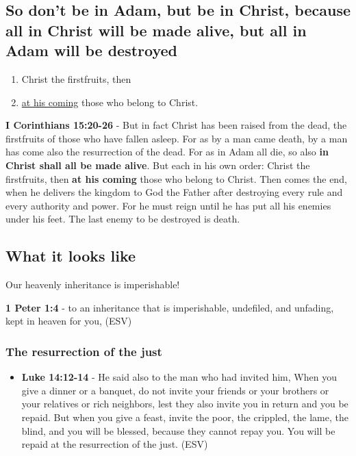 \documentclass[11pt]{article}
\begin{document}
\subsection{So don't be in Adam, but be in Christ, because all in Christ will be made alive, but all in Adam will be destroyed}
\label{sec:org59de661}
\begin{enumerate}
\item Christ the firstfruits, then
\item \uline{at his coming} those who belong to Christ.
\end{enumerate}

\textbf{I Corinthians 15:20-26} - But in fact Christ has been raised from the dead, the firstfruits of those who have fallen asleep.  For as by a man came death, by a man has come also the resurrection of the dead.  For as in Adam all die, so also \textbf{in Christ shall all be made alive}.  But each in his own order: Christ the firstfruits, then \textbf{at his coming} those who belong to Christ.  Then comes the end, when he delivers the kingdom to God the Father after destroying every rule and every authority and power.  For he must reign until he has put all his enemies under his feet.  The last enemy to be destroyed is death.

\subsection{What it looks like}
\label{sec:org24aba59}
Our heavenly inheritance is imperishable!

\textbf{1 Peter 1:4} -  to an inheritance that is imperishable, undefiled, and unfading, kept in heaven for you,  (ESV)

\subsubsection{The resurrection of the just}
\label{sec:orgfc2032a}
\begin{itemize}
\item \textbf{Luke 14:12-14} - He said also to the man who had invited him, When you give a dinner or a banquet, do not invite your friends or your brothers or your relatives or rich neighbors, lest they also invite you in return and you be repaid. But when you give a feast, invite the poor, the crippled, the lame, the blind, and you will be blessed, because they cannot repay you. You will be repaid at the resurrection of the just. (ESV)
\end{itemize}
\end{document}
